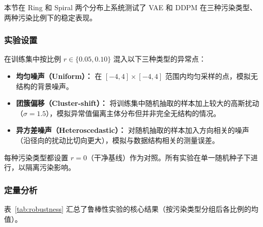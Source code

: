 \documentclass[UTF8,a4paper,12pt]{ctexart}
\begin{document}
本节在 Ring 和 Spiral 两个分布上系统测试了 VAE 和 DDPM 在三种污染类型、两种污染比例下的稳定表现。

\subsubsection{实验设置}

在训练集中按比例 $r\in\{0.05, 0.10\}$ 混入以下三种类型的异常点：

\begin{itemize}
    \item \textbf{均匀噪声（Uniform）：} 在 $[-4,4]\times[-4,4]$ 范围内均匀采样的点，模拟无结构的背景噪声。
    \item \textbf{团簇偏移（Cluster-shift）：} 将训练集中随机抽取的样本加上较大的高斯扰动（$\sigma=1.5$），模拟异常值偏离主体分布但并非完全无结构的情况。
    \item \textbf{异方差噪声（Heteroscedastic）：} 对随机抽取的样本加入方向相关的噪声（沿径向的扰动比切向更大），模拟与数据结构相关的测量误差。
\end{itemize}

每种污染类型都设置 $r=0$（干净基线）作为对照。所有实验在单一随机种子下进行，以隔离污染影响。

\subsubsection{定量分析}

表~\ref{tab:robustness} 汇总了鲁棒性实验的核心结果（按污染类型分组后各比例的均值）。
\end{document}

